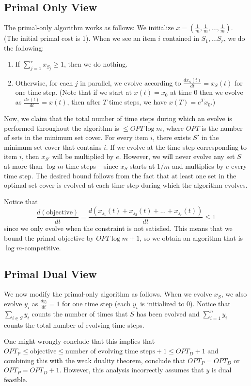 \documentclass[11pt]{article}
\begin{document}
\subsection{Primal Only View}
The primal-only algorithm works as follows: We initialize $x = \left(\frac{1}{m}, \frac{1}{m}, \ldots, \frac{1}{m} \right)$. (The initial primal cost is $1$). When we see an item $i$ contained in $S_1, \ldots S_r$, we do the following:
\begin{enumerate}
\item{If $\sum_{j=1}^r x_{S_j} \ge 1$, then we do nothing.}
\item{Otherwise, for each $j$ in parallel, we evolve according to $\frac{dx_S(t)}{dt} = x_S(t)$ for one time step. (Note that if we start at $x(t) = x_0$ at time $0$ then we evolve as $\frac{dx(t)}{dt} = x(t)$, then after $T$ time steps, we have $x(T) = e^T x_0$.)} 
\end{enumerate}
Now, we claim that the total number of time steps during which an evolve is performed throughout the algorithm is $\le OPT \log m$, where $OPT$ is the number of sets in the minimum set cover. For every item $i$, there exists $S'$ in the minimum set cover that contains $i$. If we evolve at the time step corresponding to item $i$, then $x_{S'}$ will be multiplied by $e$. However, we will never evolve any set $S$ at more than $\log m$ time steps -- since $x_S$ starts at $1/m$ and multiplies by $e$ every time step. The desired bound follows from the fact that at least one set in the optimal set cover is evolved at each time step during which the algorithm evolves.

Notice that 
\[\frac{d(\text{objective})}{dt} = \frac{d(x_{s_1}(t) + x_{s_2}(t) + \ldots + x_{s_r}(t))}{dt} \le 1\] since we only evolve when the constraint is not satisfied. This means that we bound the primal objective by $OPT \log m + 1$, so we obtain an algorithm that is $\log m$-competitive.
\subsection{Primal Dual View}
We now modify the primal-only algorithm as follows. When we evolve $x_S$, we also evolve $y_i$ as $\frac{dy_i}{dt} = 1$ for one time step (each $y_i$ is initialized to $0$). Notice that $\sum_{i \in S} y_i$ counts the number of times that $S$ has been evolved and $\sum_{i=1}^n y_i$ counts the total number of evolving time steps.

One might wrongly conclude that this implies that $OPT_\text{P} \le \text{objective} \le \text{number of evolving time steps} + 1  \le OPT_D + 1$ and combining this with the weak duality theorem, conclude that $OPT_P = OPT_D$ or $OPT_P = OPT_D + 1$. However, this analysis incorrectly assumes that $y$ is dual feasible. 
\end{document}

